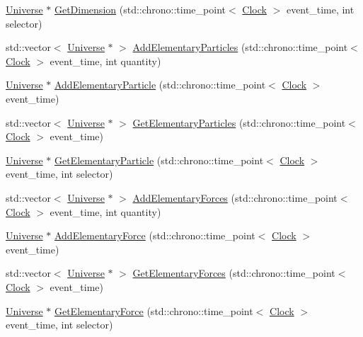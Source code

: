 \begin{DoxyCompactItemize}
\item 
\hyperlink{class_universe}{Universe} $\ast$ \hyperlink{class_universe_ab79a380dee684c6dc304b571f4d28645}{Get\+Dimension} (std\+::chrono\+::time\+\_\+point$<$ \hyperlink{universe_8h_a0ef8d951d1ca5ab3cfaf7ab4c7a6fd80}{Clock} $>$ event\+\_\+time, int selector)
\item 
std\+::vector$<$ \hyperlink{class_universe}{Universe} $\ast$ $>$ \hyperlink{class_universe_a857cf7f208cd11c80736e82fa523feb5}{Add\+Elementary\+Particles} (std\+::chrono\+::time\+\_\+point$<$ \hyperlink{universe_8h_a0ef8d951d1ca5ab3cfaf7ab4c7a6fd80}{Clock} $>$ event\+\_\+time, int quantity)
\item 
\hyperlink{class_universe}{Universe} $\ast$ \hyperlink{class_universe_ab9c84e0576de50aa4fa46655832ce5e4}{Add\+Elementary\+Particle} (std\+::chrono\+::time\+\_\+point$<$ \hyperlink{universe_8h_a0ef8d951d1ca5ab3cfaf7ab4c7a6fd80}{Clock} $>$ event\+\_\+time)
\item 
std\+::vector$<$ \hyperlink{class_universe}{Universe} $\ast$ $>$ \hyperlink{class_universe_a168fd9bf7602adcba1de5dd93a212775}{Get\+Elementary\+Particles} (std\+::chrono\+::time\+\_\+point$<$ \hyperlink{universe_8h_a0ef8d951d1ca5ab3cfaf7ab4c7a6fd80}{Clock} $>$ event\+\_\+time)
\item 
\hyperlink{class_universe}{Universe} $\ast$ \hyperlink{class_universe_acef54e17666d17078c522388f8f6e4f9}{Get\+Elementary\+Particle} (std\+::chrono\+::time\+\_\+point$<$ \hyperlink{universe_8h_a0ef8d951d1ca5ab3cfaf7ab4c7a6fd80}{Clock} $>$ event\+\_\+time, int selector)
\item 
std\+::vector$<$ \hyperlink{class_universe}{Universe} $\ast$ $>$ \hyperlink{class_universe_a81d294300346e9f901836ab609cce942}{Add\+Elementary\+Forces} (std\+::chrono\+::time\+\_\+point$<$ \hyperlink{universe_8h_a0ef8d951d1ca5ab3cfaf7ab4c7a6fd80}{Clock} $>$ event\+\_\+time, int quantity)
\item 
\hyperlink{class_universe}{Universe} $\ast$ \hyperlink{class_universe_a90c573dec55f2b3ad5680015356f5f25}{Add\+Elementary\+Force} (std\+::chrono\+::time\+\_\+point$<$ \hyperlink{universe_8h_a0ef8d951d1ca5ab3cfaf7ab4c7a6fd80}{Clock} $>$ event\+\_\+time)
\item 
std\+::vector$<$ \hyperlink{class_universe}{Universe} $\ast$ $>$ \hyperlink{class_universe_a6a8ed579b2eedd3aceebda9f3d78aa0e}{Get\+Elementary\+Forces} (std\+::chrono\+::time\+\_\+point$<$ \hyperlink{universe_8h_a0ef8d951d1ca5ab3cfaf7ab4c7a6fd80}{Clock} $>$ event\+\_\+time)
\item 
\hyperlink{class_universe}{Universe} $\ast$ \hyperlink{class_universe_a9506017d944cb64e67567477c1505a53}{Get\+Elementary\+Force} (std\+::chrono\+::time\+\_\+point$<$ \hyperlink{universe_8h_a0ef8d951d1ca5ab3cfaf7ab4c7a6fd80}{Clock} $>$ event\+\_\+time, int selector)

\end{DoxyCompactItemize}
